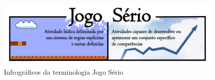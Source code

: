 



\pagebreak

\begin{figure}[htb]

	\caption{\label{fig:JS}Infrográficos da terminologia Jogo Sério}\vspace{-0,5cm}
  \begin{center}
    \includegraphics[width=\linewidth]{./Figuras/JogoSerio.pdf}
	\end{center} \vspace{-0,9cm}

\end{figure}

